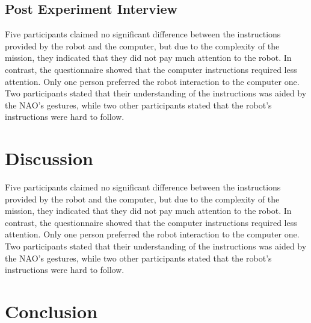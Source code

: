 \documentclass[conference]{IEEEtran}
\begin{document}
\subsection{Post Experiment Interview}
Five participants claimed no significant difference between the instructions provided by the robot and the computer, but due to the complexity of the mission, they indicated that they did not pay much attention to the robot. In contrast, the questionnaire showed that the computer instructions required less attention. Only one person preferred the robot interaction to the computer one. Two participants stated that their understanding of the instructions was aided by the NAO’s gestures, while two other participants stated that the robot's instructions were hard to follow. 


\section{Discussion}
Five participants claimed no significant difference between the instructions provided by the robot and the computer, but due to the complexity of the mission, they indicated that they did not pay much attention to the robot. In contrast, the questionnaire showed that the computer instructions required less attention. Only one person preferred the robot interaction to the computer one. Two participants stated that their understanding of the instructions was aided by the NAO’s gestures, while two other participants stated that the robot's instructions were hard to follow. 
\section{Conclusion}





\end{document}
